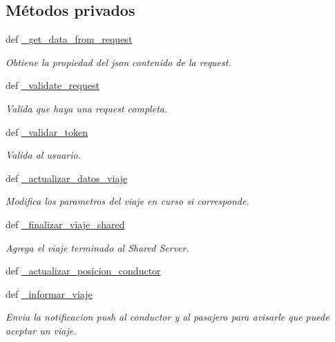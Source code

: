 \subsection*{Métodos privados}
\begin{DoxyCompactItemize}
\item 
def \hyperlink{classsrc_1_1resources_1_1driver_modificar_posicion_1_1_conductor_modificar_posicion_aeb0a85b50e4dff9aadf447c18e047927}{\-\_\-get\-\_\-data\-\_\-from\-\_\-request}
\begin{DoxyCompactList}\small\item\em Obtiene la propiedad del json contenido de la request. \end{DoxyCompactList}\item 
def \hyperlink{classsrc_1_1resources_1_1driver_modificar_posicion_1_1_conductor_modificar_posicion_ab108939cbeb442ef668b9e9a3f73256b}{\-\_\-validate\-\_\-request}
\begin{DoxyCompactList}\small\item\em Valida que haya una request completa. \end{DoxyCompactList}\item 
def \hyperlink{classsrc_1_1resources_1_1driver_modificar_posicion_1_1_conductor_modificar_posicion_ac748fc1e6dadb7fb7c12e21bc83d9bfa}{\-\_\-validar\-\_\-token}
\begin{DoxyCompactList}\small\item\em Valida al usuario. \end{DoxyCompactList}\item 
def \hyperlink{classsrc_1_1resources_1_1driver_modificar_posicion_1_1_conductor_modificar_posicion_afef21f0ec8f37cda7789bcf231949ed5}{\-\_\-actualizar\-\_\-datos\-\_\-viaje}
\begin{DoxyCompactList}\small\item\em Modifica los parametros del viaje en curso si corresponde. \end{DoxyCompactList}\item 
def \hyperlink{classsrc_1_1resources_1_1driver_modificar_posicion_1_1_conductor_modificar_posicion_aeeb384bdfda9dcd7c844fd10b3fc4480}{\-\_\-finalizar\-\_\-viaje\-\_\-shared}
\begin{DoxyCompactList}\small\item\em Agrega el viaje terminado al Shared Server. \end{DoxyCompactList}\item 
def \hyperlink{classsrc_1_1resources_1_1driver_modificar_posicion_1_1_conductor_modificar_posicion_a41f849ecba78284f88af9c50546d59b1}{\-\_\-actualizar\-\_\-posicion\-\_\-conductor}
\item 
def \hyperlink{classsrc_1_1resources_1_1driver_modificar_posicion_1_1_conductor_modificar_posicion_adc94a99055bb492b01e9749381338cd2}{\-\_\-informar\-\_\-viaje}
\begin{DoxyCompactList}\small\item\em Envia la notificacion push al conductor y al pasajero para avisarle que puede aceptar un viaje. \end{DoxyCompactList}\end{DoxyCompactItemize}


